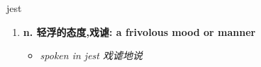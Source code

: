 
\begin{frame}
{\huge jest}
\begin{center}
\begin{enumerate}\Large
  \item \textbf{n. 轻浮的态度,戏谑: a frivolous mood or manner}
  \begin{itemize}
    \item \em{\Large{spoken in jest 戏谑地说}}
  \end{itemize}
\end{enumerate}
\end{center}
\end{frame}
